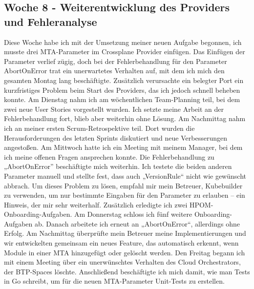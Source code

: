 \subsection{Woche 8 - Weiterentwicklung des Providers und Fehleranalyse}
Diese Woche habe ich mit der Umsetzung meiner neuen Aufgabe begonnen, ich
musste drei MTA-Parameter im Crossplane Provider einfügen. Das Einfügen der
Parameter verlief zügig, doch bei der Fehlerbehandlung für den Parameter
AbortOnError trat ein unerwartetes Verhalten auf, mit dem ich mich den gesamten
Montag lang beschäftigte. Zusätzlich verursachte ein belegter Port ein kurzfristiges
Problem beim Start des Providers, das ich jedoch schnell beheben konnte.
Am Dienstag nahm ich am wöchentlichen Team-Planning teil, bei dem zwei neue
User Stories vorgestellt wurden. Ich setzte meine Arbeit an der Fehlerbehandlung
fort, blieb aber weiterhin ohne Lösung. Am Nachmittag nahm ich an meiner ersten
Scrum-Retrospektive teil. Dort wurden die Herausforderungen des letzten Sprints
diskutiert und neue Verbesserungen angestoßen.
Am Mittwoch hatte ich ein Meeting mit meinem Manager, bei dem ich meine offenen
Fragen ansprechen konnte. Die Fehlerbehandlung zu „AbortOnError” beschäftigte
mich weiterhin. Ich testete die beiden anderen Parameter manuell und stellte fest,
dass auch „VersionRule“ nicht wie gewünscht abbrach. Um dieses Problem zu
lösen, empfahl mir mein Betreuer, Kubebuilder zu verwenden, um nur bestimmte
Eingaben für den Parameter zu erlauben – ein Hinweis, der mir sehr weiterhalf.
Zusätzlich erledigte ich zwei HPOM-Onboarding-Aufgaben.
Am Donnerstag schloss ich fünf weitere Onboarding-Aufgaben ab. Danach arbeitete
ich erneut an „AbortOnError“, allerdings ohne Erfolg. Am Nachmittag überprüfte
mein Betreuer meine Implementierungen und wir entwickelten gemeinsam ein
neues Feature, das automatisch erkennt, wenn Module in einer MTA hinzugefügt
oder gelöscht werden.
Den Freitag begann ich mit einem Meeting über ein unerwünschtes Verhalten des
Cloud Orchestrators, der BTP-Spaces löschte. Anschließend beschäftigte ich mich
damit, wie man Tests in Go schreibt, um für die neuen MTA-Parameter Unit-Tests zu
erstellen.

